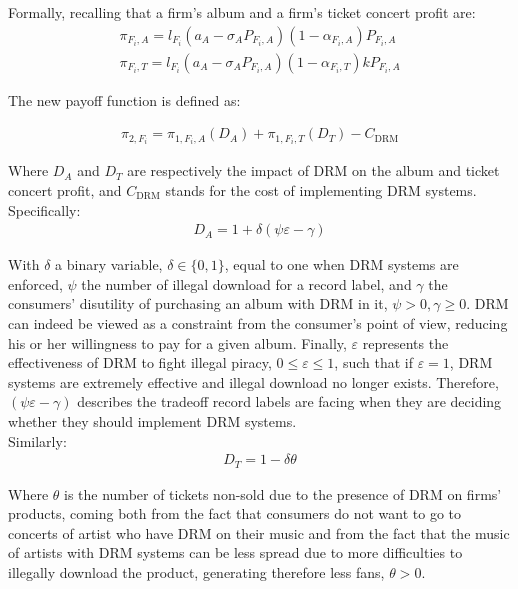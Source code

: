 \documentclass[letter,12pt]{article}
\numberwithin{equation}{section}
\newcommand{\drm}{\text{DRM}}
\newcommand{\firmpayoff}[2]{\pi_{{#1}, F_{#2}}}
\newcommand{\firmalbum}[2]{\pi_{#1, F_{#2}, A}}
\newcommand{\firmticket}[2]{\pi_{#1, F_{#2}, T}}
\newcommand{\drminf}{(\psi \varepsilon - \gamma)}
\begin{document}
Formally, recalling that a firm’s album and a firm’s ticket concert profit are:
\begin{eqnarray}
\pi_{F_i, A} = l_{F_i} (a_A - \sigma_A P_{F_i, A})(1 - \alpha_{F_i, A}) P_{F_i, A}\\
\pi_{F_i, T} = l_{F_i} (a_A - \sigma_A P_{F_i, A})(1 - \alpha_{F_i, T}) k P_{F_i, A}
\end{eqnarray}

The new payoff function is defined as:

\begin{eqnarray}
\firmpayoff{2}{i} = \firmalbum{1}{i} (D_A) + \firmticket{1}{i}  (D_T) - C_{\drm}
\label{Eq:FirmTotalPayoffDRM}
\end{eqnarray}

Where $D_A$ and $D_T$ are respectively the impact of DRM on the album and ticket concert profit, and $C_{\drm}$ stands for the cost of implementing DRM systems. Specifically:
\begin{eqnarray}
D_A = 1 + \delta \drminf
\label{Eq:DA}
\end{eqnarray}

With $\delta$ a binary variable, $\delta \in \{0, 1\}$, equal to one when DRM systems are enforced, $\psi$ the number of illegal download for a record label, and $\gamma$ the consumers’ disutility of purchasing an album with DRM in it, $\psi > 0, \gamma \geq 0$. DRM can indeed be viewed as a constraint from the consumer’s point of view, reducing his or her willingness to pay for a given album. Finally, $\varepsilon$ represents the effectiveness of DRM to fight illegal piracy, $0 \leq \varepsilon \leq 1$, such that if $\varepsilon = 1$, DRM systems are extremely effective and illegal download no longer exists. Therefore, $\drminf$ describes the tradeoff record labels are facing when they are deciding whether they should implement DRM systems.\\

Similarly:
\begin{eqnarray}
D_T = 1 - \delta \theta
\label{Eq:DT}
\end{eqnarray}

Where $\theta$ is the number of tickets non-sold due to the presence of DRM on firms’ products, coming both from the fact that consumers do not want to go to concerts of artist who have DRM on their music and from the fact that the music of artists with DRM systems can be less spread due to more difficulties to illegally download the product, generating therefore less fans, $\theta > 0$.\\
\end{document}

